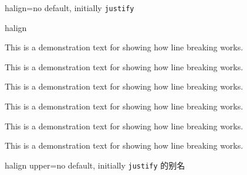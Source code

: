 \begin{docTcbKey}[][doc new=2015-05-07]{halign}{=}{no default, initially \texttt{justify}}
    

\begin{exdispExample}{halign}

\begin{tcolorbox}[adjusted title=flush center,halign=flush center]
This is a demonstration text for showing how line breaking works.
\end{tcolorbox}
\begin{tcolorbox}[adjusted title=flush left,halign=flush left]
This is a demonstration text for showing how line breaking works.
\end{tcolorbox}
\begin{tcolorbox}[adjusted title=flush right,halign=flush right]
This is a demonstration text for showing how line breaking works.
\end{tcolorbox}

\begin{tcolorbox}[adjusted title=center,halign=center]
This is a demonstration text for showing how line breaking works.
\end{tcolorbox}
\begin{tcolorbox}[adjusted title=left,halign=left]
This is a demonstration text for showing how line breaking works.
\end{tcolorbox}
\begin{tcolorbox}[adjusted title=right,halign upper=right]
This is a demonstration text for showing how line breaking works.
\end{tcolorbox}
\end{exdispExample}

\end{docTcbKey}


\begin{docTcbKey}[][doc new=2015-05-07]{halign upper}{=}{no default, initially \texttt{justify}}
 的别名
\end{docTcbKey}



